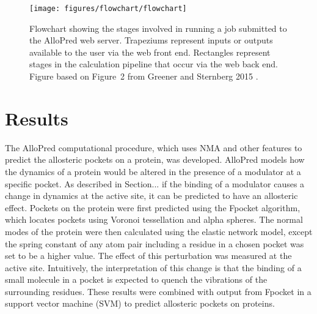 \begin{figure}
\centering

\texttt{[image: figures/flowchart/flowchart]}

\caption[Flowchart showing the stages involved in running a job submitted to the AlloPred web server]
{Flowchart showing the stages involved in running a job submitted to the AlloPred web server.
Trapeziums represent inputs or outputs available to the user via the web front end.
Rectangles represent stages in the calculation pipeline that occur via the web back end.
Figure based on Figure~2 from Greener and Sternberg 2015 \cite{Greener2015}.}

\label{fig:flowchart}
\end{figure}


\section{Results}
\label{sec:allopred_results}

The AlloPred computational procedure, which uses NMA and other features to predict the allosteric pockets on a protein, was developed.
AlloPred models how the dynamics of a protein would be altered in the presence of a modulator at a specific pocket.
As described in Section... if the binding of a modulator causes a change in dynamics at the active site, it can be predicted to have an allosteric effect.
Pockets on the protein were first predicted using the Fpocket \cite{LeGuilloux2009} algorithm, which locates pockets using Voronoi tessellation and alpha spheres.
The normal modes of the protein were then calculated using the elastic network model, except the spring constant of any atom pair including a residue in a chosen pocket was set to be a higher value.
The effect of this perturbation was measured at the active site.
Intuitively, the interpretation of this change is that the binding of a small molecule in a pocket is expected to quench the vibrations of the surrounding residues.
These results were combined with output from Fpocket in a support vector machine (SVM) to predict allosteric pockets on proteins.

